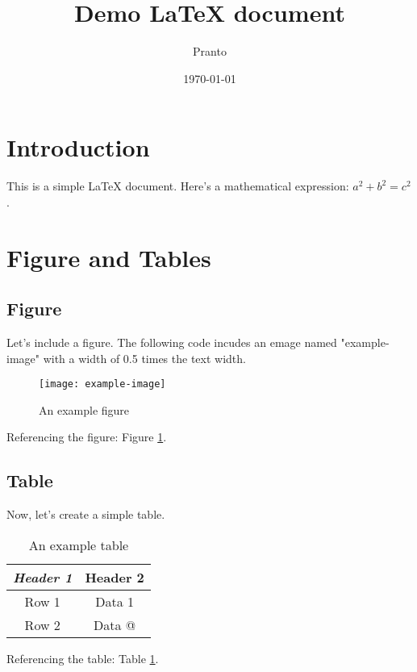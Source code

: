 \documentclass{article}
\title{Demo LaTeX document}
\author{Pranto}
\date{\today}
\begin{document}
    \maketitle

    \section{Introduction}
    This is a simple LaTeX document. Here's a mathematical expression: $a^2 + b^2 = c^2$. 

    \section{Figure and Tables}
    \subsection{Figure}
    Let's include a figure. The following code incudes an emage named "example-image" with a width of 0.5 times the text width.
    \begin{figure}[ht]
        \centering
        \texttt{[image: example-image]}
        \caption{An example figure}
        \label{fig:example}
    \end{figure}
    Referencing the figure: Figure \ref{fig:example}.
    
    \subsection{Table}
    Now, let's create a simple table.

    \begin{table}[ht]
        \centering
        \begin{tabular}{|c|c|}
            \hline
            \textbf{\textit{Header 1}} & \textbf{Header 2} \\
            \hline  
            Row 1 & Data 1 \\
            Row 2 & Data @ \\
            \hline          
        \end{tabular}
        \caption{An example table}
        \label{tab:example}
    \end{table}

Referencing the table: Table \ref{tab:example}.
\end{document}
